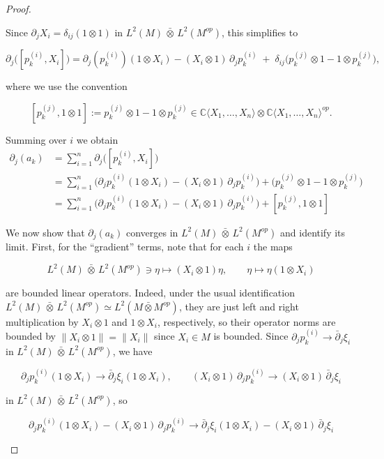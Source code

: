 \documentclass[10pt,a4paper,reqno]{amsart}
\begin{document}
\begin{proof}
\begin{enumerate}
Since $\partial_j X_i = \delta_{ij}(1\otimes 1)$ in $L^2(M)\,\bar\otimes\,L^2(M^{op})$, this simplifies to


\[
\partial_j\big([p_k^{(i)},X_i]\big)
 = \partial_j(p_k^{(i)})(1\otimes X_i) - (X_i\otimes 1)\,\partial_j p_k^{(i)}
   \;+\; \delta_{ij}\big(p_k^{(j)}\otimes 1 - 1\otimes p_k^{(j)}\big),
\]


where we use the convention


\[
[p_k^{(j)},1\otimes 1] := p_k^{(j)}\otimes 1 - 1\otimes p_k^{(j)}\in \mathbb{C}\langle X_1,\ldots,X_n\rangle \otimes \mathbb{C}\langle X_1,\ldots,X_n\rangle^{op}.
\]



Summing over $i$ we obtain
\begin{align*}
\partial_j(a_k)
 &= \sum_{i=1}^n\partial_j\big([p_k^{(i)},X_i]\big) \\
 &= \sum_{i=1}^n\Big(\partial_j p_k^{(i)}(1\otimes X_i)
                     - (X_i\otimes 1)\,\partial_j p_k^{(i)}\Big)
    +  \big(p_k^{(j)}\otimes 1 - 1\otimes p_k^{(j)}\big)\\
    &=\sum_{i=1}^n\Big(\partial_j p_k^{(i)}(1\otimes X_i)
                     - (X_i\otimes 1)\,\partial_j p_k^{(i)}\Big)+ [p_k^{(j)},1\otimes 1]
\end{align*}


We now show that $\partial_j(a_k)$ converges in $L^2(M)\,\bar\otimes\,L^2(M^{op})$ and identify its limit.
First, for the “gradient” terms, note that for each $i$ the maps


\[
L^2(M)\,\bar\otimes\,L^2(M^{op})\ni \eta \mapsto (X_i\otimes 1)\eta,\qquad
\eta\mapsto \eta(1\otimes X_i)
\]


are bounded linear operators. Indeed, under the usual identification
$L^2(M)\,\bar\otimes\,L^2(M^{op}) \simeq L^2(M\bar\otimes M^{op})$, they are just left
and right multiplication by $X_i\otimes 1$ and $1\otimes X_i$, respectively, so their
operator norms are bounded by $\|X_i\otimes 1\|=\|X_i\|$ since $X_i\in M$ is bounded.
\newline
Since $\partial_j p_k^{(i)}\to \bar\partial_j\xi_i$
in $L^2(M)\,\bar\otimes\,L^2(M^{op})$, we have


\[
\partial_j p_k^{(i)}(1\otimes X_i)
 \longrightarrow \bar\partial_j\xi_i(1\otimes X_i),\qquad
(X_i\otimes 1)\,\partial_j p_k^{(i)}
 \longrightarrow (X_i\otimes 1)\,\bar\partial_j\xi_i
\]


in $L^2(M)\,\bar\otimes\,L^2(M^{op})$, so


\[
\partial_j p_k^{(i)}(1\otimes X_i) - (X_i\otimes 1)\,\partial_j p_k^{(i)}
 \longrightarrow \bar\partial_j\xi_i(1\otimes X_i) - (X_i\otimes 1)\,\bar\partial_j\xi_i
\]



\end{enumerate}
\end{proof}
\end{document}
